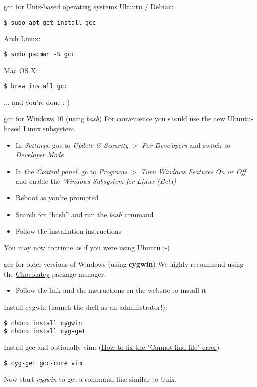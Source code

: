 \begin{frame}[fragile]{gcc for Unix-based operating systems}
	Ubuntu / Debian:
	\begin{lstlisting}[numbers=none]
$ sudo apt-get install gcc
\end{lstlisting}
	\bigskip
	Arch Linux:
	\begin{lstlisting}[numbers=none]
$ sudo pacman -S gcc
\end{lstlisting}
	\bigskip
	Mac OS X:
	\begin{lstlisting}[numbers=none]
$ brew install gcc
\end{lstlisting}
	\bigskip
	... and you're done ;-)
\end{frame}

\begin{frame}{gcc for Windows 10 (using \textit{bash})}
	For convenience you should use the new Ubuntu-based Linux subsystem.\\
	\bigskip
	\begin{itemize}
		\item In \textit{Settings}, got to \textit{Update \& Security} $>$ \textit{For Developers}
			and switch to \textit{Developer Mode}
		\item In the \textit{Control panel}, go to \textit{Programs} $>$ \textit{Turn Windows Features On or Off}
			and enable the \textit{Windows Subsystem for Linux (Beta)}
		\item Reboot as you're prompted
		\item Search for ``bash'' and run the \textit{bash} command
		\item Follow the installation instructions
	\end{itemize}
	\bigskip
	You may now continue as if you were using Ubuntu ;-)
\end{frame}

\begin{frame}[fragile]{gcc for older versions of Windows (using \textbf{cygwin})}
	We highly recommend using the \href{https://chocolatey.org/}{Chocolatey} package manager.\\
	\begin{itemize}
		\item Follow the link and the instructions on the website to install it
	\end{itemize}
	\bigskip
	Install cygwin (launch the shell as an administrator!):
	\begin{lstlisting}[numbers=none]
$ choco install cygwin
$ choco install cyg-get
\end{lstlisting}
	\bigskip
	Install gcc and optionally vim: {\scriptsize(\href{https://github.com/chocolatey/chocolatey-coreteampackages/issues/176#issuecomment-212939458}{How to fix the "Cannot find file" error})}
	\begin{lstlisting}[numbers=none]
$ cyg-get gcc-core vim
\end{lstlisting}
	\bigskip
	Now start \textit{cygwin} to get a command line similar to Unix.
\end{frame}

